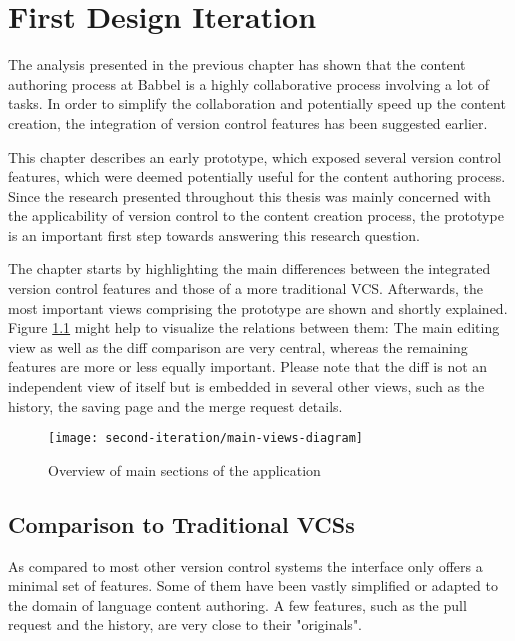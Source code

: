\chapter{First Design Iteration} \label{chapter:design-first-iteration}
The analysis presented in the previous chapter has shown that the content authoring process at Babbel is a highly collaborative process involving a lot of tasks. In order to simplify the collaboration and potentially speed up the content creation, the integration of version control features has been suggested earlier.

This chapter describes an early prototype, which exposed several version control features, which were deemed potentially useful for the content authoring process. Since the research presented throughout this thesis was mainly concerned with the applicability of version control to the content creation process, the prototype is an important first step towards answering this research question.

The chapter starts by highlighting the main differences between the integrated version control features and those of a more traditional VCS. Afterwards, the most important views comprising the prototype are shown and shortly explained. Figure \ref{fig:main-views-diagram} might help to visualize the relations between them: The main editing view as well as the diff comparison are very central, whereas the remaining features are more or less equally important. Please note that the diff is not an independent view of itself but is embedded in several other views, such as the history, the saving page and the merge request details.

\begin{figure}[h!]
 \centering
 \texttt{[image: second-iteration/main-views-diagram]}
 \caption{Overview of main sections of the application}
 \label{fig:main-views-diagram}
\end{figure}

\section{Comparison to Traditional VCSs} \label{sec:git-feature-comparison}
As compared to most other version control systems the interface only offers a minimal set of features. Some of them have been vastly simplified or adapted to the domain of language content authoring. A few features, such as the pull request and the history, are very close to their "originals".

